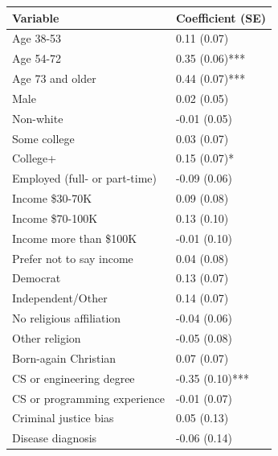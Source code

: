\documentclass{article}
\begin{document}
\begin{table}[h]
\centering
\begin{tabular}{p{4.5cm}p{3cm}}
\hline
Variable & Coefficient (SE)\\
\hline

Age 38-53 & 0.11 (0.07)\\

Age 54-72 & 0.35 (0.06)***\\

Age 73 and older & 0.44 (0.07)***\\

Male & 0.02 (0.05)\\

Non-white & -0.01 (0.05)\\

Some college & 0.03 (0.07)\\

College+ & 0.15 (0.07)*\\

Employed (full- or part-time) & -0.09 (0.06)\\

Income \$30-70K & 0.09 (0.08)\\

Income \$70-100K & 0.13 (0.10)\\

Income more than \$100K & -0.01 (0.10)\\

Prefer not to say income & 0.04 (0.08)\\

Democrat & 0.13 (0.07)\\

Independent/Other & 0.14 (0.07)\\

No religious affiliation & -0.04 (0.06)\\

Other religion & -0.05 (0.08)\\

Born-again Christian & 0.07 (0.07)\\

CS or engineering degree & -0.35 (0.10)***\\

CS or programming experience & -0.01 (0.07)\\

Criminal justice bias & 0.05 (0.13)\\

Disease diagnosis & -0.06 (0.14)\\


\end{tabular}
\end{table}
\end{document}
